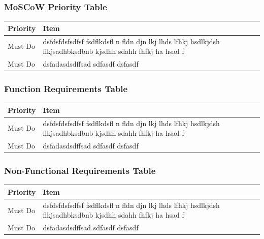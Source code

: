 \documentclass[12pt,a4paper]{article}
\begin{document}
\subsubsection{MoSCoW Priority Table}

\begin{center}
\begin{tabular}{ | m{4em} | m{24em}| } 
\hline
Priority & Item \\ [1pt]
\hline
Must Do & dsfdsfdsfsdfsf fsdflkdsfl n fldn djn lkj lhds lfhkj hsdlkjdsh flkjsadhbksdbnb kjsdhh sdahh fhfkj ha hsad f \\ 
\hline
Must Do & dsfadasdsdffsad sdfasdf dsfasdf \\ 
\hline
\end{tabular}
\end{center}


\subsubsection{Function Requirements Table}

\begin{center}
\begin{tabular}{ | m{4em} | m{24em}| } 
\hline
Priority & Item \\ [1pt]
\hline
Must Do & dsfdsfdsfsdfsf fsdflkdsfl n fldn djn lkj lhds lfhkj hsdlkjdsh flkjsadhbksdbnb kjsdhh sdahh fhfkj ha hsad f \\ 
\hline
Must Do & dsfadasdsdffsad sdfasdf dsfasdf \\ 
\hline
\end{tabular}
\end{center}


\subsubsection{Non-Functional Requirements Table}

\begin{center}
\begin{tabular}{ | m{4em} | m{24em}| } 
\hline
Priority & Item \\ [1pt]
\hline
Must Do & dsfdsfdsfsdfsf fsdflkdsfl n fldn djn lkj lhds lfhkj hsdlkjdsh flkjsadhbksdbnb kjsdhh sdahh fhfkj ha hsad f \\ 
\hline
Must Do & dsfadasdsdffsad sdfasdf dsfasdf \\ 
\hline
\end{tabular}
\end{center}
\end{document}
